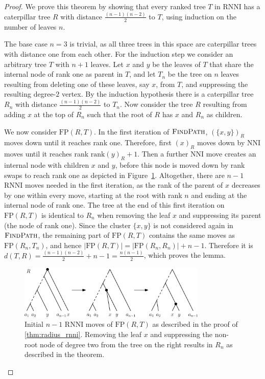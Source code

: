 \documentclass[11pt]{amsart}
\newcommand{\rnni}{\mathrm{RNNI}}
\newcommand{\findpath}{\textsc{FindPath}}
\newcommand{\rank}{\mathrm{rank}}
\newcommand{\nni}{\mathrm{NNI}}
\newcommand{\fp}{\mathrm{FP}}
\begin{document}
\begin{proof}
	We prove this theorem by showing that every ranked tree $T$ in $\rnni$ has a caterpillar tree $R$ with distance $\frac{(n-1)(n-2)}{2}$ to $T$, using induction on the number of leaves $n$.

	The base case $n=3$ is trivial, as all three trees in this space are caterpillar trees with distance one from each other.
	For the induction step we consider an arbitrary tree $T$ with $n+1$ leaves.
	Let $x$ and $y$ be the leaves of $T$ that share the internal node of rank one as parent in $T$, and let $T_n$ be the tree on $n$ leaves resulting from deleting one of these leaves, say $x$, from $T$, and suppressing the resulting degree-$2$ vertex.
	By the induction hypothesis there is a caterpillar tree $R_n$ with distance $\frac{(n-1)(n-2)}{2}$ to $T_n$.
	Now consider the tree $R$ resulting from adding $x$ at the top of $R_n$ such that the root of $R$ has $x$ and $R_n$ as children.

	We now consider $\fp(R,T)$.
	In the first iteration of $\findpath$, $(\{x,y\})_R$ moves down until it reaches rank one.
	Therefore, first $(x)_R$ moves down by $\nni$ moves until it reaches rank $\rank(y)_R + 1$.
	Then a further $\nni$ move creates an internal node with children $x$ and $y$, before this node is moved down by rank swaps to reach rank one as depicted in Figure~\ref{fig:max_dist_ctree}.
	Altogether, there are $n-1$ $\rnni$ moves needed in the first iteration, as the rank of the parent of $x$ decreases by one within every move, starting at the root with rank $n$ and ending at the internal node of rank one.
	The tree at the end of this first iteration on $\fp(R,T)$ is identical to $R_n$ when removing the leaf $x$ and suppressing its parent (the node of rank one).
	Since the cluster $\{x,y\}$ is not considered again in $\findpath$, the remaining part of $\fp(R,T)$ contains the same moves as $\fp(R_n,T_n)$, and hence $|\fp(R,T)| = |\fp(R_n,R_n)| + n-1$.
	Therefore it is $d(T,R) = \frac{(n-1)(n-2)}{2} + n-1 = \frac{n(n-1)}{2}$, which proves the lemma.
	\begin{figure}[ht]
		\includegraphics[width=0.8\textwidth]{max_dist_ctree.eps}
		\caption{Initial $n - 1$ $\rnni$ moves of $\fp(R,T)$ as described in the proof of \autoref{thm:radius_rnni}.
		Removing the leaf $x$ and suppressing the non-root node of degree two from the tree on the right results in $R_n$ as described in the theorem.}
		\label{fig:max_dist_ctree}
	\end{figure}
\end{proof}
\end{document}
